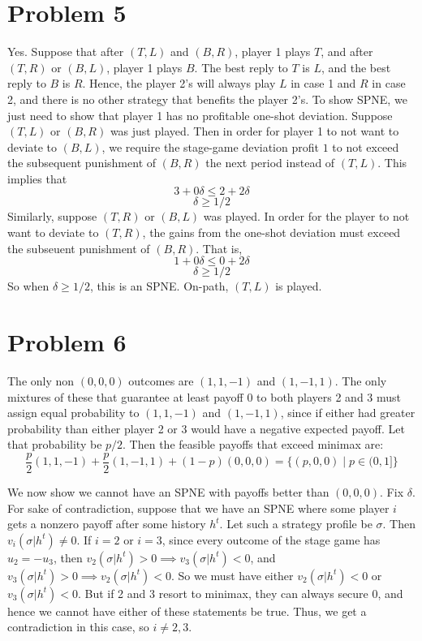 \documentclass[10pt,letter]{article}
\begin{document}
\section*{Problem 5}
Yes. Suppose that after $(T,L)$ and $(B,R)$, player 1 plays $T$, and after $(T,R)$ or $(B,L)$, player 1 plays $B$. The best reply to $T$ is $L$, and the best reply to $B$ is $R$. Hence, the player 2's will always play $L$ in case 1 and $R$ in case 2, and there is no other strategy that benefits the player 2's. To show SPNE, we just need to show that player 1 has no profitable one-shot deviation. Suppose $(T,L)$ or $(B,R)$ was just played. Then in order for player 1 to not want to deviate to $(B,L)$, we require the stage-game deviation profit $1$ to not exceed the subsequent punishment of $(B,R)$ the next period instead of $(T,L)$. This implies that
\[ 3 + 0\delta \le 2 + 2\delta \]
\[ \delta \ge 1/2 \]
Similarly, suppose $(T,R)$ or $(B,L)$ was played. In order for the player to not want to deviate to $(T,R)$, the gains from the one-shot deviation must exceed the subseuent punishment of $(B,R)$. That is,
\[ 1 + 0\delta \le 0 + 2 \delta  \]
\[ \delta \ge 1/2 \]
So when $\delta \ge 1/2$, this is an SPNE. On-path, $(T,L)$ is played.

\section*{Problem 6}
The only non $(0,0,0)$ outcomes are $(1,1,-1)$ and $(1,-1,1)$. The only mixtures of these that guarantee at least payoff 0 to both players 2 and 3 must assign equal probability to $(1,1,-1)$ and $(1,-1,1)$, since if either had greater probability than either player 2 or 3 would have a negative expected payoff. Let that probability be $p/2$. Then the feasible payoffs that exceed minimax are:
\[ \frac{p}{2}(1,1,-1) + \frac{p}{2}(1,-1,1) + (1-p)(0,0,0) = \{ (p, 0, 0) \mid p \in (0,1] \} \]

We now show we cannot have an SPNE with payoffs better than $(0,0,0)$. Fix $\delta$. For sake of contradiction, suppose that we have an SPNE where some player $i$ gets a nonzero payoff after some history $h^t$. Let such a strategy profile be $\sigma$. Then $v_i(\sigma | h^t) \neq 0$. If $i = 2$ or $i=3$, since every outcome of the stage game has $u_2 = - u_3$, then $v_2(\sigma |h^t) > 0 \implies v_3(\sigma|h^t) < 0$, and $v_3(\sigma |h^t) > 0 \implies v_2(\sigma|h^t) < 0$.
So we must have either $v_2(\sigma |h^t) < 0$ or $v_3(\sigma |h^t) < 0$. But if 2 and 3 resort to minimax, they can always secure 0, and hence we cannot have either of these statements be true. Thus, we get a contradiction in this case, so $i \neq 2, 3$.
\end{document}
